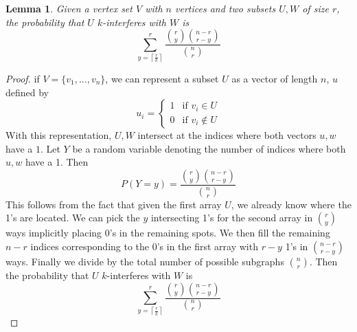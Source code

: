 \documentclass[10pt]{extarticle}
\newtheorem{lemma}[theorem]{Lemma}
\theoremstyle{definition}
\begin{document}
\begin{lemma}
    Given a vertex set $V$ with $n$ vertices and two subsets $U,W$ of size $r$, the probability that $U$ $k$-interferes with $W$ is 
    \begin{equation*}
        \sum_{y = \left\lceil \frac{r}{k} \right\rceil}^{r}  \frac{\binom{r}{y} \binom{n-r}{r-y}}{\binom{n}{r}}
    \end{equation*}
\end{lemma}
\begin{proof}
    if $V = \{v_1,...,v_n\}$, we can represent a subset $U$ as a vector of length $n$, $u$ defined by
    $$
    u_i = \begin{cases}
        1 & \text{if } v_i \in U \\
        0 & \text{if } v_i \notin U
    \end{cases}
    $$
    With this representation, $U,W$ intersect at the indices where both vectors $u, w$ have a $1$. Let $Y$ be a random variable denoting the number of indices where both $u, w$ have a 1. Then 
    \begin{equation}
        P(Y=y) = \frac{\binom{r}{y} \binom{n-r}{r-y}}{\binom{n}{r}}
    \end{equation}
    This follows from the fact that given the first array $U$, we already know where the 1's are located. We can pick the $y$ intersecting 1's for the second array in $\binom{r}{y}$ ways implicitly placing 0's in the remaining spots. We then fill the remaining $n-r$ indices corresponding to the 0's in the first array with $r-y$ 1's in $\binom{n-r}{r-y}$ ways. Finally we divide by the total number of possible subgraphs $\binom{n}{r}$. 
    Then the probability that $U$ $k$-interferes with $W$ is 
    \begin{equation}
        \sum_{y = \left\lceil \frac{r}{k} \right\rceil}^{r}  \frac{\binom{r}{y} \binom{n-r}{r-y}}{\binom{n}{r}}
    \end{equation}
\end{proof}
\end{document}
